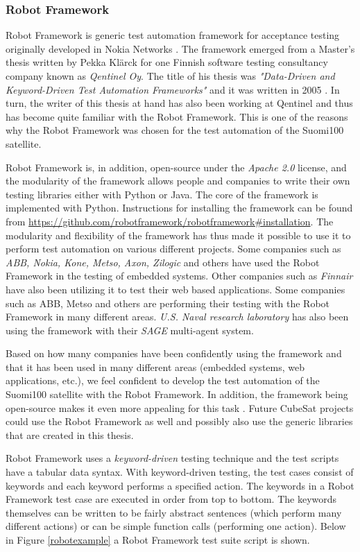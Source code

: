 \documentclass[english,12pt,a4paper,pdftex,elec,utf8]{aaltothesis}
\begin{document}
\subsubsection{Robot Framework}
Robot Framework is generic test automation framework for acceptance testing originally developed in Nokia Networks \cite{robotmain}. The framework emerged from a Master's thesis written by Pekka Klärck for one Finnish software testing consultancy company known as \textit{Qentinel Oy}. The title of his thesis was \textit{"Data-Driven and Keyword-Driven Test Automation Frameworks"} and it was written in 2005 \cite{robotmain, klerkdippa}. In turn, the writer of this thesis at hand has also been working at Qentinel and thus has become quite familiar with the Robot Framework. This is one of the reasons why the Robot Framework was chosen for the test automation of the Suomi100 satellite. \par 
Robot Framework is, in addition, open-source under the \textit{Apache 2.0} license, and the modularity of the framework allows people and companies to write their own testing libraries either with Python or Java. The core of the framework is implemented with Python. Instructions for installing the framework can be found from \url{https://github.com/robotframework/robotframework#installation}.
The modularity and flexibility of the framework has thus made it possible to use it to perform test automation on various different projects. Some companies such as \textit{ABB, Nokia, Kone, Metso, Axon, Zilogic} and others have used the Robot Framework in the testing of embedded systems. Other companies such as \textit{Finnair} have also been utilizing it to test their web based applications. Some companies such as ABB, Metso and others are performing their testing with the Robot Framework in many different areas. \textit{U.S. Naval research laboratory} has also been using the framework with their \textit{SAGE} multi-agent system. \cite{robotmain}\par 
Based on how many companies have been confidently using the framework \cite{robotmain} and that it has been used in many different areas (embedded systems, web applications, etc.), we feel confident to develop the test automation of the Suomi100 satellite with the Robot Framework. In addition, the framework being open-source makes it even more appealing for this task \cite{robotmain}. Future CubeSat projects could use the Robot Framework as well and possibly also use the generic libraries that are created in this thesis.\par
Robot Framework uses a \textit{keyword-driven} testing technique and the test scripts have a tabular data syntax. With keyword-driven testing, the test cases consist of keywords and each keyword performs a specified action. The keywords in a Robot Framework test case are executed in order from top to bottom. The keywords themselves can be written to be fairly abstract sentences (which perform many different actions) or can be simple function calls (performing one action). Below in Figure \ref{robotexample} a Robot Framework test suite script is shown. \cite{robotuserguide}\par 
\end{document}
